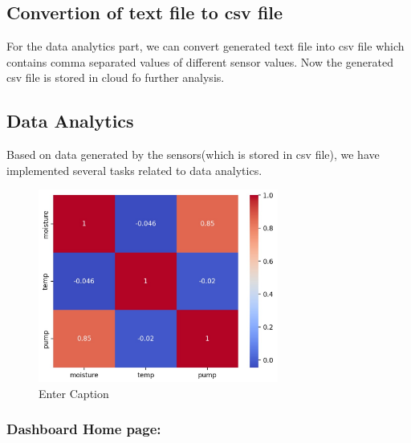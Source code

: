 \documentclass{article}
\begin{document}
\subsection{Convertion of text file to csv file}
For the data analytics part, we can convert generated text file into csv file which contains comma separated values of different sensor values.
Now the generated csv file is stored in cloud fo further analysis.
\newpage
\subsection{Data Analytics}
Based on data generated by the sensors(which is stored in csv file), we have implemented several tasks related to data analytics.
\begin{figure}[h]
    \centering
    \includegraphics[width=0.75\linewidth, height=2.5in]{dataanalytics.jpg}
    \caption{Enter Caption}
    \label{fig:enter-label}
\end{figure}
\newpage
\subsubsection{Dashboard Home page: }
\end{document}
